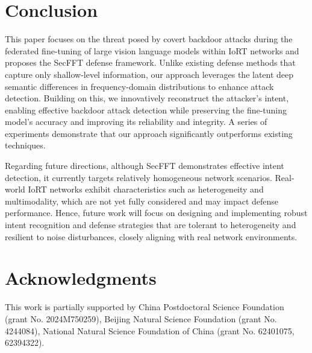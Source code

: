 \documentclass[lettersize,journal]{IEEEtran}
\begin{document}
\section{Conclusion}
This paper focuses on the threat posed by covert backdoor attacks during the federated fine-tuning of large vision language models within IoRT networks and proposes the SecFFT defense framework. Unlike existing defense methods that capture only shallow-level information, our approach leverages the latent deep semantic differences in frequency-domain distributions to enhance attack detection. Building on this, we innovatively reconstruct the attacker’s intent, enabling effective backdoor attack detection while preserving the fine-tuning model's accuracy and improving its reliability and integrity. 
A series of experiments demonstrate that our approach significantly outperforms existing techniques. %

Regarding future directions, although SecFFT demonstrates effective intent detection, it currently targets relatively homogeneous network scenarios. Real-world IoRT networks exhibit characteristics such as heterogeneity and multimodality, which are not yet fully considered and may impact defense performance. Hence, future work will focus on designing and implementing robust intent recognition and defense strategies that are tolerant to heterogeneity and resilient to noise disturbances, closely aligning with real network environments.



\section*{Acknowledgments}
This work is partially supported by China Postdoctoral Science Foundation (grant No. 2024M750259), Beijing Natural Science Foundation (grant No. 4244084), National Natural Science Foundation of China (grant No. 62401075, 62394322).
\end{document}
